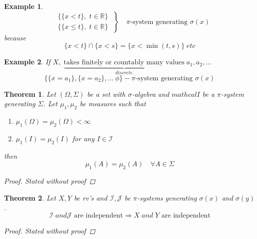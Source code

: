 \documentclass[12pt]{article}
\def\RR{\mathbb{R}}
\newtheorem{theorem}{Theorem}[section]
\newtheorem{example}{Example}[section]
\begin{document}
\begin{example}
\[
 \left.\begin{aligned} 
       &\{ \{x<t\}, \; t \in \RR\} \\
        &\{ \{x\leq t\}, \; t \in \RR\}
       \end{aligned} \; \right\}
 \quad \text{$\pi$-system generating } \sigma(x)\]
because 
\[\{x<t\}\cap \{x<s\} = \{x<\min(t,s)\} \; etc\]
\end{example}
\begin{example}
If $X,\; \underbrace{\text{takes finitely or countably many values}}_{discrete} \; a_1, a_2 , \dots$
\[\{\{x=a_1\}, \{x=a_2\}, \dots \ \phi \} - \text{$\pi$-system generating } \sigma(x)\]
\end{example}

\begin{theorem}\label{ind1}
Let $(\Omega, \Sigma)$ be a set with $\sigma$-algebra and $mathcal{I}$ be a $\pi$-system generating $\Sigma$. Let $\mu_1 , \mu_2$ be measures such that \begin{enumerate}
\item $\mu_1(\Omega) = \mu_2(\Omega) < \infty$
\item $\mu_1(I) = \mu_2(I)$ for any $I \in \mathcal{I}$ \end{enumerate}
then \[\mu_1(A) = \mu_2(A)\quad \forall A \in \Sigma\]
\begin{proof} Stated without proof \end{proof}
\end{theorem}

\begin{theorem}
Let $X,Y$ be rv's and $\mathcal{I}, \mathcal{J}$ be $\pi$-systems generating $\sigma(x)$ and $\sigma(y)$.
\[ \mathcal{I}\; and  \mathcal{J} \text{ are independent} \Rightarrow X \;and\; Y \text{ are independent}\]
 \begin{proof} Stated without proof \end{proof}
\end{theorem}
\end{document}
